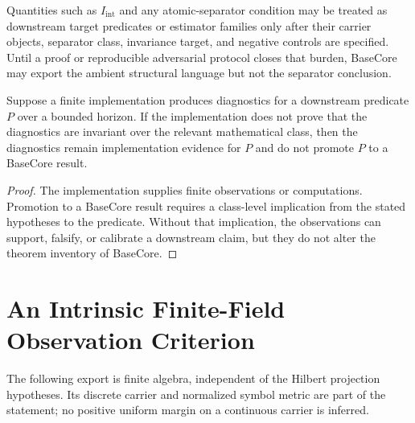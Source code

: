 \begin{remark}
Quantities such as $I_{\mathrm{int}}$ and any atomic-separator condition may be treated as downstream target predicates or estimator families only after their carrier objects, separator class, invariance target, and negative controls are specified. Until a proof or reproducible adversarial protocol closes that burden, BaseCore may export the ambient structural language but not the separator conclusion.
\end{remark}

\begin{proposition}
Suppose a finite implementation produces diagnostics for a downstream predicate $P$ over a bounded horizon. If the implementation does not prove that the diagnostics are invariant over the relevant mathematical class, then the diagnostics remain implementation evidence for $P$ and do not promote $P$ to a BaseCore result.
\end{proposition}

\begin{proof}
The implementation supplies finite observations or computations. Promotion to a BaseCore result requires a class-level implication from the stated hypotheses to the predicate. Without that implication, the observations can support, falsify, or calibrate a downstream claim, but they do not alter the theorem inventory of BaseCore.
\end{proof}


\section{An Intrinsic Finite-Field Observation Criterion}

The following export is finite algebra, independent of the Hilbert projection
hypotheses. Its discrete carrier and normalized symbol metric are part of the
statement; no positive uniform margin on a continuous carrier is inferred.

